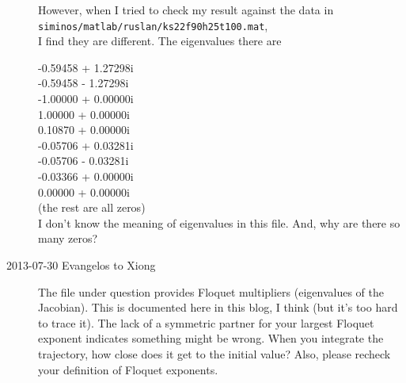 \begin{description}
However, when I tried to check my result against the data in
\\
\texttt{siminos/matlab/ruslan/ks22f90h25t100.mat},
\\
I find they are different. The eigenvalues there are

      -0.59458 + 1.27298i\\
      -0.59458 - 1.27298i\\
      -1.00000 + 0.00000i\\
       1.00000 + 0.00000i\\
       0.10870 + 0.00000i\\
      -0.05706 + 0.03281i\\
      -0.05706 - 0.03281i\\
      -0.03366 + 0.00000i\\
       0.00000 + 0.00000i\\
       (the rest are all zeros) \\

I don't know the meaning of eigenvalues in this file. And, why are there
so many zeros?

\item[2013-07-30 Evangelos to Xiong]
The file under question provides Floquet multipliers (eigenvalues of the Jacobian). This is documented here in this blog, I think (but it's too hard to trace it).
The lack of a symmetric partner for your largest Floquet exponent indicates something might be wrong. When you integrate the trajectory, how close does it get to
the initial value? Also, please recheck your definition of Floquet exponents.


\end{description}
